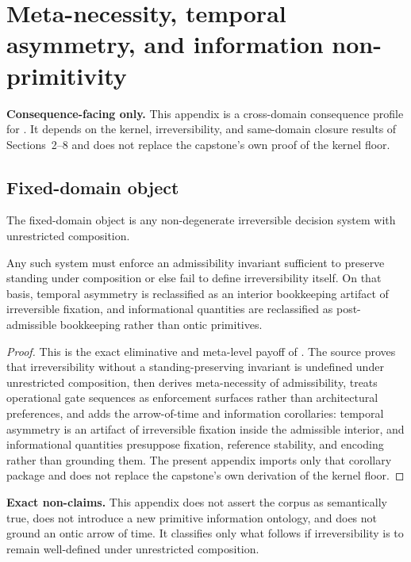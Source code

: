 \section{Meta-necessity, temporal asymmetry, and information non-primitivity}
\label{app:meta-necessity}

\begin{fixedbox}
\textbf{Consequence-facing only.} This appendix is a cross-domain consequence profile for \metanecessitydoc{}. It depends on the kernel, irreversibility, and same-domain closure results of Sections~2--8 and does not replace the capstone's own proof of the kernel floor.
\end{fixedbox}

\subsection*{Fixed-domain object}
The fixed-domain object is any non-degenerate irreversible decision system with unrestricted composition.

\begin{proposition}
Any such system must enforce an admissibility invariant sufficient to preserve standing under composition or else fail to define irreversibility itself. On that basis, temporal asymmetry is reclassified as an interior bookkeeping artifact of irreversible fixation, and informational quantities are reclassified as post-admissible bookkeeping rather than ontic primitives.
\end{proposition}

\begin{proof}
This is the exact eliminative and meta-level payoff of \metanecessitydoc{}. The source proves that irreversibility without a standing-preserving invariant is undefined under unrestricted composition, then derives meta-necessity of admissibility, treats operational gate sequences as enforcement surfaces rather than architectural preferences, and adds the arrow-of-time and information corollaries: temporal asymmetry is an artifact of irreversible fixation inside the admissible interior, and informational quantities presuppose fixation, reference stability, and encoding rather than grounding them. The present appendix imports only that corollary package and does not replace the capstone's own derivation of the kernel floor.\cite{MaleyMetaNecessity}
\end{proof}

\begin{reviewbox}
\textbf{Exact non-claims.} This appendix does not assert the corpus as semantically true, does not introduce a new primitive information ontology, and does not ground an ontic arrow of time. It classifies only what follows if irreversibility is to remain well-defined under unrestricted composition.\cite{MaleyMetaNecessity}
\end{reviewbox}
